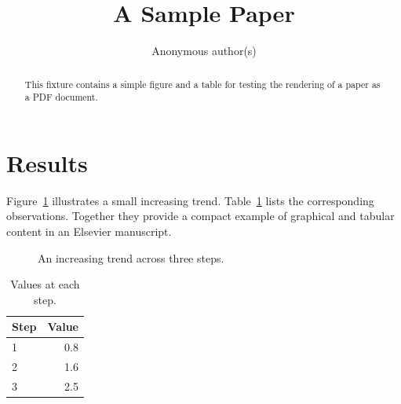 \documentclass[preprint,12pt]{elsarticle}
\begin{document}
\begin{frontmatter}
\title{A Sample Paper}
\author{Anonymous author(s)}
\begin{abstract}
This fixture contains a simple figure and a table for testing the rendering of a paper as a PDF document.
\end{abstract}
\end{frontmatter}

\section{Results}
Figure~\ref{fig:trend} illustrates a small increasing trend. Table~\ref{tab:values} lists the corresponding observations. Together they provide a compact example of graphical and tabular content in an Elsevier manuscript.

\begin{figure}[ht]
\centering
{}
\caption{An increasing trend across three steps.}
\label{fig:trend}
\end{figure}

\begin{table}[ht]
\centering
\caption{Values at each step.}
\label{tab:values}
\begin{tabular}{lr}
\toprule
Step & Value \\
\midrule
1 & 0.8 \\
2 & 1.6 \\
3 & 2.5 \\
\bottomrule
\end{tabular}
\end{table}
\end{document}
